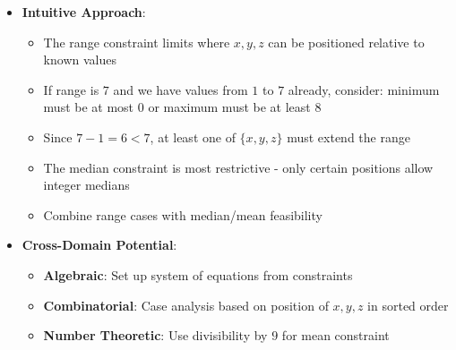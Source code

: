 \documentclass[11pt]{article}
\begin{document}
\begin{problemconfigbox}
\begin{itemize}[leftmargin=*]
    \item \textbf{Intuitive Approach}: 
    \begin{itemize}
        \item The range constraint limits where $x, y, z$ can be positioned relative to known values
        \item If range is $7$ and we have values from $1$ to $7$ already, consider: minimum must be at most $0$ or maximum must be at least $8$
        \item Since $7 - 1 = 6 < 7$, at least one of $\{x, y, z\}$ must extend the range
        \item The median constraint is most restrictive - only certain positions allow integer medians
        \item Combine range cases with median/mean feasibility
    \end{itemize}
    
    \item \textbf{Cross-Domain Potential}: 
    \begin{itemize}
        \item \textbf{Algebraic}: Set up system of equations from constraints
        \item \textbf{Combinatorial}: Case analysis based on position of $x, y, z$ in sorted order
        \item \textbf{Number Theoretic}: Use divisibility by $9$ for mean constraint
    \end{itemize}
\end{itemize}
\end{problemconfigbox}
\end{document}
